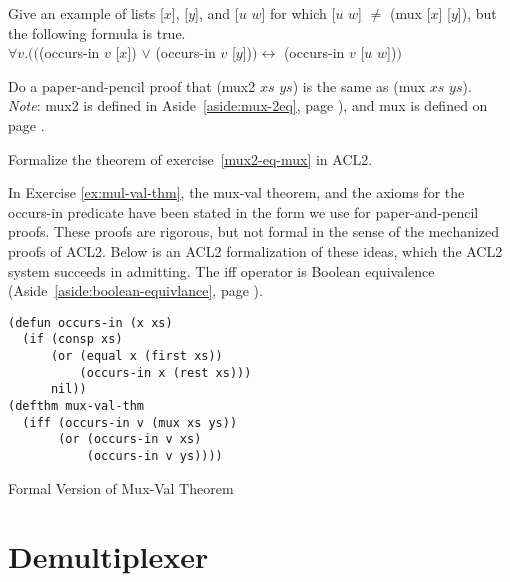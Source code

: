 \begin{ExerciseList}
\Exercise\label{mux-val-len-not-enough}
Give an example of lists \textsf{[$x$]}, \textsf{[$y$]}, and \textsf{[$u$ $w$]} for which
\textsf{[$u$ $w$]} $\neq$ \textsf{(mux [$x$] [$y$])}, but the following formula is true.\\
\hspace*{1cm}$\forall v.(($\textsf{(occurs-in $v$ [$x$])} $\vee$ \textsf{(occurs-in $v$ [$y$])}$)
\leftrightarrow$ \textsf{(occurs-in $v$ [$u$ $w$])}$)$

\Exercise\label{mux2-eq-mux}
Do a paper-and-pencil proof that
\textsf{(mux2 $xs$ $ys$)} is the same as \textsf{(mux $xs$ $ys$)}.\\
\emph{Note}: \textsf{mux2} is defined in
Aside~\ref{aside:mux-2eq}, page \pageref{aside:mux-2eq}),
and \textsf{mux} is defined on page \pageref{mux-defun}.

\Exercise
Formalize the theorem of exercise~\ref{mux2-eq-mux} in ACL2.

\end{ExerciseList}

\begin{aside}
In Exercise \ref{ex:mul-val-thm}, the mux-val theorem,
and the axioms for the occurs-in predicate
have been stated in the form we use for paper-and-pencil proofs.
These proofs are rigorous, but not formal
in the sense of the mechanized proofs of ACL2.
Below is an ACL2 formalization of these ideas,
which the ACL2 system succeeds in admitting.
\label{acl2:iff}
The
\textsf{iff}
operator is Boolean equivalence
(Aside~\ref{aside:boolean-equivlance}, page \pageref{aside:boolean-equivlance}).

\label{defun:occurs-in}
\begin{Verbatim}
(defun occurs-in (x xs)
  (if (consp xs)
      (or (equal x (first xs))
          (occurs-in x (rest xs)))
      nil))
(defthm mux-val-thm
  (iff (occurs-in v (mux xs ys))
       (or (occurs-in v xs)
           (occurs-in v ys))))
\end{Verbatim}
\label{defthm:mux-val}
\caption{Formal Version of Mux-Val Theorem}
\label{aside:mux-val-thm}
\end{aside}

\section{Demultiplexer}
\label{sec:dmx}

